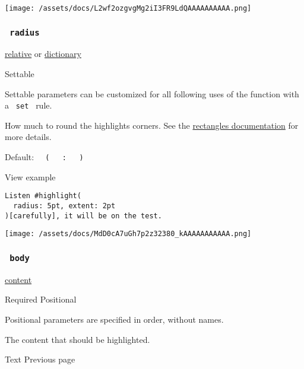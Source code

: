 \texttt{[image: /assets/docs/L2wf2ozgvgMg2iI3FR9LdQAAAAAAAAAA.png]}

\subsubsection{\texorpdfstring{\texttt{\ radius\ }}{ radius }}\label{parameters-radius}

\href{/docs/reference/layout/relative/}{relative} {or}
\href{/docs/reference/foundations/dictionary/}{dictionary}

{{ Settable }}

\label{parameters-radius-settable-tooltip}
Settable parameters can be customized for all following uses of the
function with a \texttt{\ set\ } rule.

How much to round the highlight\textquotesingle s corners. See the
\href{/docs/reference/visualize/rect/\#parameters-radius}{rectangle\textquotesingle s
documentation} for more details.

Default:
\texttt{\ }{\texttt{\ (\ }}\texttt{\ }{\texttt{\ :\ }}\texttt{\ }{\texttt{\ )\ }}\texttt{\ }


View example

\begin{verbatim}
Listen #highlight(
  radius: 5pt, extent: 2pt
)[carefully], it will be on the test.
\end{verbatim}

\texttt{[image: /assets/docs/MdD0cA7uGh7p2z32380\_kAAAAAAAAAAA.png]}

\subsubsection{\texorpdfstring{\texttt{\ body\ }}{ body }}\label{parameters-body}

\href{/docs/reference/foundations/content/}{content}

{Required} {{ Positional }}

\label{parameters-body-positional-tooltip}
Positional parameters are specified in order, without names.

The content that should be highlighted.

\href{/docs/reference/text/}{\pandocbounded{}}

{ Text } { Previous page }

